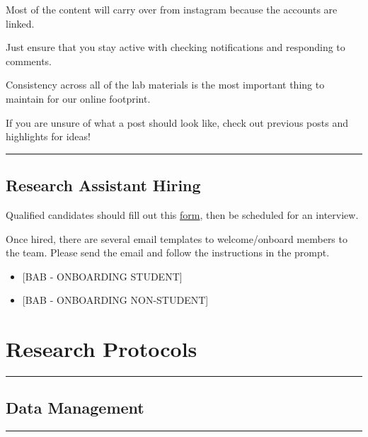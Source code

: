 \documentclass[]{book}
\providecommand{\tightlist}{%
  \setlength{\itemsep}{0pt}\setlength{\parskip}{0pt}}
\begin{document}
Most of the content will carry over from instagram because the accounts are linked.

Just ensure that you stay active with checking notifications and responding to comments.

Consistency across all of the lab materials is the most important thing to maintain for our online footprint.

If you are unsure of what a post should look like, check out previous posts and highlights for ideas!

\begin{center}\rule{0.5\linewidth}{\linethickness}\end{center}

\hypertarget{research-assistant-hiring}{%
\section{Research Assistant Hiring}\label{research-assistant-hiring}}

Qualified candidates should fill out this \href{https://docs.google.com/forms/d/1WDX1bcG9omdbDOrQnQXXMcPyl9itPG_MIwfFHBcWYqs/edit}{form}, then be scheduled for an interview.

Once hired, there are several email templates to welcome/onboard members to the team. Please send the email and follow the instructions in the prompt.

\begin{itemize}
\tightlist
\item
  {[}BAB - ONBOARDING STUDENT{]}
\item
  {[}BAB - ONBOARDING NON-STUDENT{]}
\end{itemize}

\hypertarget{research-protocols}{%
\chapter{Research Protocols}\label{research-protocols}}

\begin{center}\rule{0.5\linewidth}{\linethickness}\end{center}

\hypertarget{data-management}{%
\section{Data Management}\label{data-management}}

\begin{center}\rule{0.5\linewidth}{\linethickness}\end{center}
\end{document}
